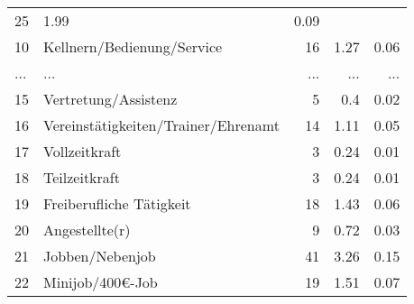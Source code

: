\begin{longtable}{lXrrr}
          \num{25} &
          \num[round-mode=places,round-precision=2]{1,99} &
          \num[round-mode=places,round-precision=2]{0,09} \\
        10 & \multicolumn{1}{X}{Kellnern/Bedienung/Service} & %
          \num{16} &
          \num[round-mode=places,round-precision=2]{1,27} &
          \num[round-mode=places,round-precision=2]{0,06} \\
       ... & ... & ... & ... & ... \\
        15 & \multicolumn{1}{X}{Vertretung/Assistenz} & %
          \num{5} &
          \num[round-mode=places,round-precision=2]{0,4} &
          \num[round-mode=places,round-precision=2]{0,02} \\

        16 & \multicolumn{1}{X}{Vereinstätigkeiten/Trainer/Ehrenamt} & %
          \num{14} &
          \num[round-mode=places,round-precision=2]{1,11} &
          \num[round-mode=places,round-precision=2]{0,05} \\

        17 & \multicolumn{1}{X}{Vollzeitkraft} & %
          \num{3} &
          \num[round-mode=places,round-precision=2]{0,24} &
          \num[round-mode=places,round-precision=2]{0,01} \\

        18 & \multicolumn{1}{X}{Teilzeitkraft} & %
          \num{3} &
          \num[round-mode=places,round-precision=2]{0,24} &
          \num[round-mode=places,round-precision=2]{0,01} \\

        19 & \multicolumn{1}{X}{Freiberufliche Tätigkeit} & %
          \num{18} &
          \num[round-mode=places,round-precision=2]{1,43} &
          \num[round-mode=places,round-precision=2]{0,06} \\

        20 & \multicolumn{1}{X}{Angestellte(r)} & %
          \num{9} &
          \num[round-mode=places,round-precision=2]{0,72} &
          \num[round-mode=places,round-precision=2]{0,03} \\

        21 & \multicolumn{1}{X}{Jobben/Nebenjob} & %
          \num{41} &
          \num[round-mode=places,round-precision=2]{3,26} &
          \num[round-mode=places,round-precision=2]{0,15} \\

        22 & \multicolumn{1}{X}{Minijob/400€-Job} & %
          \num{19} &
          \num[round-mode=places,round-precision=2]{1,51} &
          \num[round-mode=places,round-precision=2]{0,07} \\


\end{longtable}
